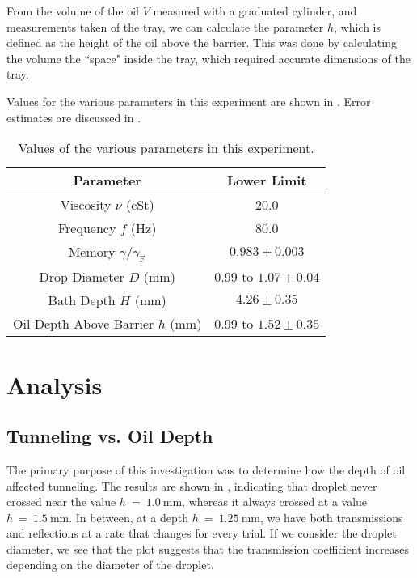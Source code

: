 From the volume of the oil $V$ measured with a graduated cylinder, and measurements taken of the tray, we can calculate the parameter $h$, which is defined as the height of the oil above the barrier. This was done by calculating the volume the ``space" inside the tray, which required accurate dimensions of the tray. %

Values for the various parameters in this experiment are shown in . Error estimates are discussed in .

	       \begin{table}[htdp] 
\caption[Basic Table 1]{Values of the various parameters in this experiment.} 
\begin{center} 
\begin{tabular}{c c} 
\toprule 
  Parameter &  Lower Limit\\
  \midrule
Viscosity $\nu$ (cSt) & 20.0 \\ 
Frequency $f$ (Hz) & 80.0 \\
Memory $\gamma/\gamma_\mathrm{F}$ & $0.983 \pm 0.003 $ \\
Drop Diameter $D$ (mm) & $0.99$ to $1.07 \pm 0.04$ \\
Bath Depth $H$ (mm) & $4.26 \pm 0.35$ \\
Oil Depth Above Barrier $h$ (mm) & $0.99$ to $1.52 \pm 0.35$ \\ 
\bottomrule 
\end{tabular}
\end{center}
\label{explimits} 
\end{table}	


\section{Analysis}


    \subsection{Tunneling vs. Oil Depth}
The primary purpose of this investigation was to determine how the depth of oil affected tunneling. The results are shown in , indicating that droplet never crossed near the value $h~=~1.0~\mathrm{mm}$, whereas it always crossed at a value $h~=~1.5~\mathrm{mm}$. In between, at a depth $h~=~1.25~\mathrm{mm}$, we have both transmissions and reflections at a rate that changes for every trial. If we consider the droplet diameter, we see that the plot suggests that the transmission coefficient increases depending on the diameter of the droplet. 

